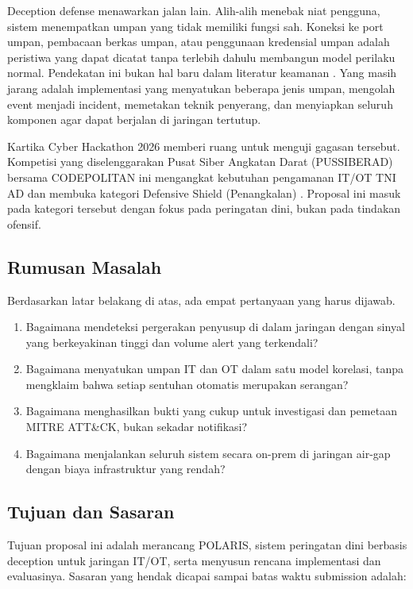 \documentclass[12pt,a4paper]{article}
\begin{document}
Deception defense menawarkan jalan lain. Alih-alih menebak niat pengguna, sistem menempatkan umpan yang tidak memiliki fungsi sah. Koneksi ke port umpan, pembacaan berkas umpan, atau penggunaan kredensial umpan adalah peristiwa yang dapat dicatat tanpa terlebih dahulu membangun model perilaku normal. Pendekatan ini bukan hal baru dalam literatur keamanan \citep{spitzner2002,provos2007,han2018}. Yang masih jarang adalah implementasi yang menyatukan beberapa jenis umpan, mengolah event menjadi incident, memetakan teknik penyerang, dan menyiapkan seluruh komponen agar dapat berjalan di jaringan tertutup.

Kartika Cyber Hackathon 2026 memberi ruang untuk menguji gagasan tersebut. Kompetisi yang diselenggarakan Pusat Siber Angkatan Darat (PUSSIBERAD) bersama CODEPOLITAN ini mengangkat kebutuhan pengamanan IT/OT TNI AD dan membuka kategori Defensive Shield (Penangkalan) \citep{kartika2026}. Proposal ini masuk pada kategori tersebut dengan fokus pada peringatan dini, bukan pada tindakan ofensif.

\subsection{Rumusan Masalah}

Berdasarkan latar belakang di atas, ada empat pertanyaan yang harus dijawab.

\begin{enumerate}[leftmargin=1.2cm,itemsep=2pt,topsep=2pt]
  \item Bagaimana mendeteksi pergerakan penyusup di dalam jaringan dengan sinyal yang berkeyakinan tinggi dan volume alert yang terkendali?
  \item Bagaimana menyatukan umpan IT dan OT dalam satu model korelasi, tanpa mengklaim bahwa setiap sentuhan otomatis merupakan serangan?
  \item Bagaimana menghasilkan bukti yang cukup untuk investigasi dan pemetaan MITRE ATT\&CK, bukan sekadar notifikasi?
  \item Bagaimana menjalankan seluruh sistem secara on-prem di jaringan air-gap dengan biaya infrastruktur yang rendah?
\end{enumerate}

\subsection{Tujuan dan Sasaran}

Tujuan proposal ini adalah merancang POLARIS, sistem peringatan dini berbasis deception untuk jaringan IT/OT, serta menyusun rencana implementasi dan evaluasinya. Sasaran yang hendak dicapai sampai batas waktu submission adalah:
\end{document}
